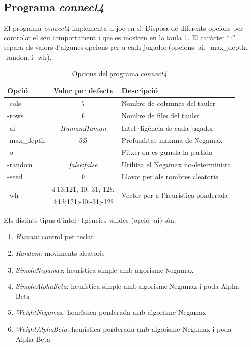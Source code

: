 \documentclass[12pt,a4paper]{article}
\begin{document}
\subsection{Programa \emph{connect4}}
El programa \emph{connect4} implementa el joc en sí. Disposa de diferents opcions per controlar el seu comportament i que es mostren en la taula \ref{tab:connect4_opts}. El caràcter ``:'' separa els valors d'algunes opcions per a cada jugador (opcions -ai, -max\_depth, -random i -wh). \\

\begin{table}[h]
\centering
\begin{tabular}{|l|c|l|}
\hline 
Opció & Valor per defecte & Descripció\\
\hline 
-cols & 7 & Nombre de columnes del tauler\\
-rows & 6 & Nombre de files del tauler\\
-ai & \emph{Human}:\emph{Human} & Intel·ligència de cada jugador \\
-max\_depth & 5:5 & Profunditat màxima de Negamax\\
-o & - & Fitxer on es guarda la partida\\
-random & \emph{false}:\emph{false} & Utilitza el Negamax no-determinista\\
-seed & 0 & Llavor per als nombres aleatoris\\
\multirow{2}{*}{-wh} & 4;13;121;-10;-31;-128: & \multirow{2}{*}{Vector per a l'heurística ponderada}\\
& 4;13;121;-10;-31;-128 & \\
\hline
\end{tabular}
\caption{Opcions del programa \emph{connect4}}
\label{tab:connect4_opts}
\end{table}

Els distints tipus d'intel·ligències vàlides (opció -ai) són:
\begin{enumerate}
\item \emph{Human}: control per teclat
\item \emph{Random}: moviments aleatoris
\item \emph{SimpleNegamax}: heurística simple amb algorisme Negamax
\item \emph{SimpleAlphaBeta}: heurística simple amb algorisme Negamax i poda Alpha-Beta
\item \emph{WeightNegamax}: heurística ponderada amb algorisme Negamax
\item \emph{WeightAlphaBeta}: heurística ponderada amb algorisme Negamax i poda Alpha-Beta
\end{enumerate}
\end{document}
